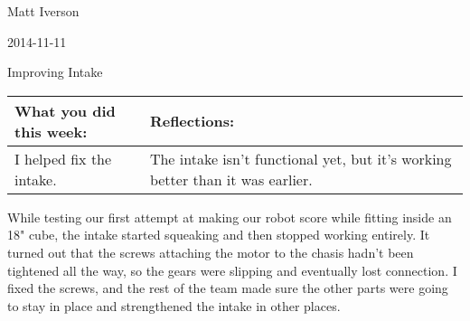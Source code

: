 Matt Iverson

2014-11-11

Improving Intake

\begin{tabular}{|p{5cm}|p{5cm}|}
 \hline
 What you did this week:
 &
 Reflections:
 \\
 \hline
 I helped fix the intake.
 &
 The intake isn't functional yet, but it's working better than it was earlier.
 \\
 \hline
\end{tabular}


While testing our first attempt at making our robot score while fitting inside an 18" cube, the intake started squeaking and then stopped working entirely. It turned out that the screws attaching the motor to the chasis hadn't been tightened all the way, so the gears were slipping and eventually lost connection. I fixed the screws, and the rest of the team made sure the other parts were going to stay in place and strengthened the intake in other places.
